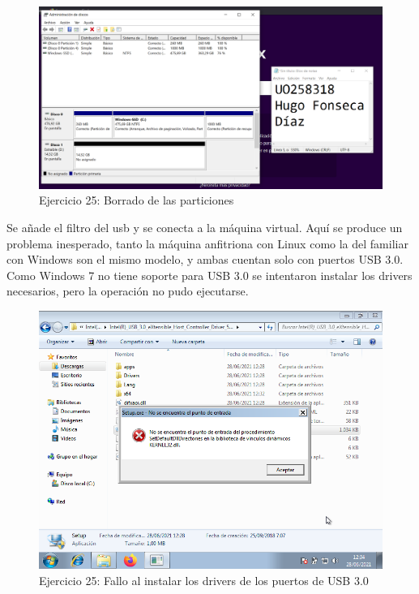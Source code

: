 \documentclass[11pt]{article}
\begin{document}
\begin{figure}[H]
    \caption{Ejercicio 25: Borrado de las particiones}
  \centering
    \includegraphics[scale=0.4]{p05/e25-2.PNG}
\end{figure}

Se añade el filtro del usb y se conecta a la máquina virtual. Aquí se produce un problema inesperado, tanto la máquina anfitriona con Linux como la del familiar con Windows son el mismo modelo, y ambas cuentan solo con puertos USB 3.0. Como Windows 7 no tiene soporte para USB 3.0 se intentaron instalar los drivers necesarios, pero la operación no pudo ejecutarse.

\begin{figure}[H]
    \caption{Ejercicio 25: Fallo al instalar los drivers de los puertos de USB 3.0}
  \centering
    \includegraphics[scale=0.8]{p05/e25-3.png}
\end{figure}
\end{document}
